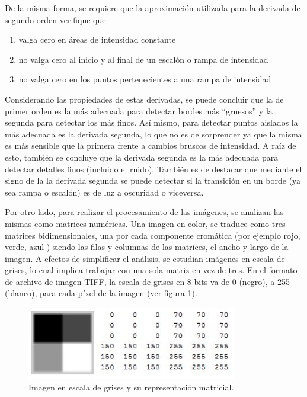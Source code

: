 De la misma forma, se requiere que la aproximación utilizada para la derivada de segundo orden verifique que:

\begin{enumerate}
\item valga cero en áreas de intensidad constante
\item no valga cero al inicio y al final de un escalón o rampa de intensidad
\item no valga cero en los puntos pertenecientes a una rampa de intensidad
\end{enumerate}

Considerando las propiedades de estas derivadas, se puede concluir que la de primer orden es la más adecuada para detectar bordes más ``gruesos'' y la segunda para detectar los más finos. Así mismo, para detectar puntos aislados la más adecuada es la derivada segunda, lo que no es de sorprender ya que la misma es más sensible que la primera frente a cambios bruscos de intensidad. A raíz de esto, también se concluye que la derivada segunda es la más adecuada para detectar detalles finos (incluido el ruido). También es de destacar que mediante el signo de la la derivada segunda se puede detectar si la transición en un borde (ya sea rampa o escalón) es de luz a oscuridad o viceversa.

Por otro lado, para realizar el procesamiento de las imágenes, se analizan las mismas como matrices numéricas. Una imagen en color, se traduce como tres matrices bidimensionales, una por cada componente cromática (por ejemplo rojo, verde, azul ) siendo las filas y columnas de las matrices, el ancho y largo de la imagen. 
A efectos de simplificar el análisis, se estudian imágenes en escala de grises, lo cual implica trabajar con una sola matriz en vez de tres. En el formato de archivo de imagen TIFF, la escala de grises en 8 bits va de 0 (negro), a 255 (blanco), para cada píxel de la imagen (ver figura \ref{gonz2}).

\begin{figure}[hbt]
\begin{center}
\includegraphics[scale=0.8]{img/02_escala_grises.jpg}
\end{center}
\caption{Imagen en escala de grises y su representación matricial.}
\label{gonz2}
\end{figure}

